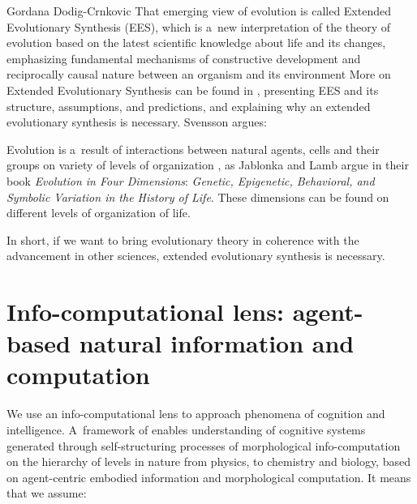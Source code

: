 \begin{artengenv}{Gordana Dodig-Crnkovic}
That emerging view of evolution is called Extended Evolutionary Synthesis (EES), which is a~new interpretation of the theory of evolution based on the latest scientific knowledge about life and its changes, emphasizing fundamental mechanisms of constructive development and reciprocally causal nature between an organism and its environment
\parencite{schwab_reciprocally_2019}
More on Extended Evolutionary Synthesis can be found in
\parencite[][]{laland_extended_2015}%
, presenting EES and its structure, assumptions, and predictions, and
\parencites{muller_correction_2017}{muller_why_2017}
explaining why an extended evolutionary synthesis is necessary. Svensson 
\parencite*[][]{svensson_reciprocal_2018} %
 argues:

Evolution is a~result of interactions between natural agents, cells and their groups on variety of levels of organization
\parencites[][]{jablonka_evolution_2014}[][]{laland_extended_2015}[][]{ginsburg_evolution_2019}, %
 as Jablonka and Lamb argue in their book \textit{Evolution in Four Dimensions}: \textit{Genetic, Epigenetic, Behavioral, and Symbolic Variation in the History of Life}. These dimensions can be found on different levels of organization of life.

In short, if we want to bring evolutionary theory in coherence with the advancement in other sciences, extended evolutionary synthesis is necessary.

\section*{Info-computational lens: agent-based natural information and computation}
We use an info-computational lens to approach phenomena of cognition and intelligence. A~framework of
\parencite{dodig-crnkovic_nature_2017}
 enables understanding of cognitive systems generated through self-structuring processes of morphological info-computation on the hierarchy of levels in nature from physics, to chemistry and biology, based on agent-centric embodied information and morphological computation. It means that we assume:


\end{artengenv}
